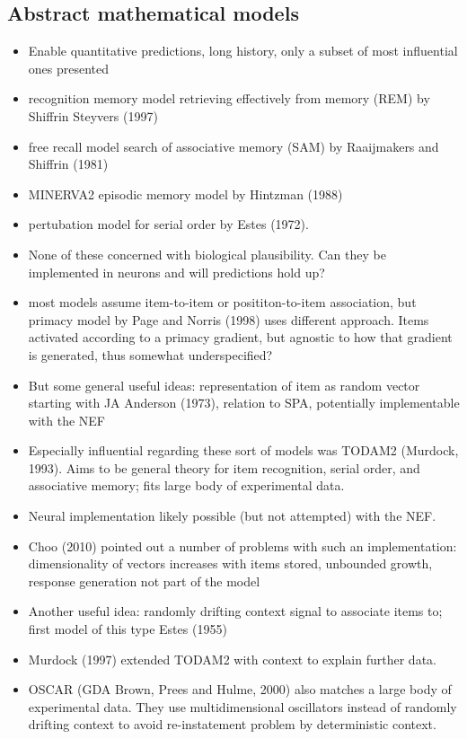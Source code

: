 \subsection{Abstract mathematical models}
\begin{itemize}
    \item Enable quantitative predictions, long history, only a subset of most influential ones presented
    \item recognition memory model retrieving effectively from memory (REM) by Shiffrin Steyvers (1997)
    \item free recall model search of associative memory (SAM) by Raaijmakers and Shiffrin (1981)
    \item MINERVA2 episodic memory model by Hintzman (1988)
    \item pertubation model for serial order by Estes (1972).
    \item None of these concerned with biological plausibility. Can they be implemented in neurons and will predictions hold up?
    \item most models assume item-to-item or posititon-to-item association, but primacy model by Page and Norris (1998) uses different approach. Items activated according to a primacy gradient, but agnostic to how that gradient is generated, thus somewhat underspecified?
    \item But some general useful ideas: representation of item as random vector starting with JA Anderson (1973), relation to SPA, potentially implementable with the NEF
    \item Especially influential regarding these sort of models was TODAM2 (Murdock, 1993). Aims to be general theory for item recognition, serial order, and associative memory; fits large body of experimental data.
    \item Neural implementation likely possible (but not attempted) with the NEF\@.
    \item Choo (2010) pointed out a number of problems with such an implementation: dimensionality of vectors increases with items stored, unbounded growth, response generation not part of the model
    \item Another useful idea: randomly drifting context signal to associate items to; first model of this type Estes (1955)
    \item Murdock (1997) extended TODAM2 with context to explain further data.
    \item OSCAR (GDA Brown, Prees and Hulme, 2000) also matches a large body of experimental data. They use multidimensional oscillators instead of randomly drifting context to avoid re-instatement problem by deterministic context.

\end{itemize}

